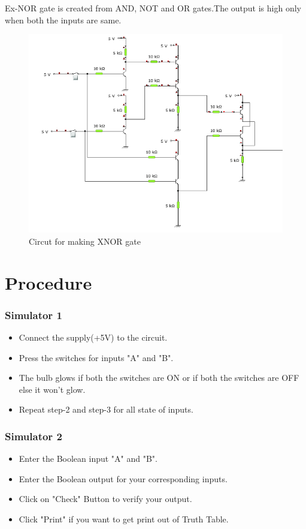 	Ex-NOR gate is created from AND, NOT and OR gates.The output is high only when both the inputs are same.
	
	\begin{figure}[h]
		\centering
		\includegraphics{img/exp7/3}
		\caption{Circut for making XNOR gate}
		\label{fig:7:3}
	\end{figure}
				
\section{Procedure}
	\subsubsection{Simulator 1}
	\begin{itemize}
		\tightlist
		\item Connect the supply(+5V) to the circuit.
		\item Press the switches for inputs "A" and "B".
		\item The bulb glows if both the switches are ON or if both the switches are OFF else it won't glow.
		\item Repeat step-2 and step-3 for all state of inputs.
	\end{itemize}

	\subsubsection{Simulator 2}
	\begin{itemize}
		\tightlist
		\item Enter the Boolean input "A" and "B".
		\item Enter the Boolean output for your corresponding inputs.
		\item Click on "Check" Button to verify your output.
		\item Click "Print" if you want to get print out of Truth Table.
	\end{itemize}


